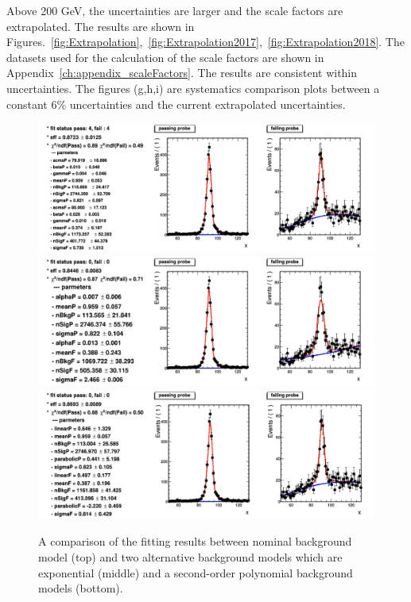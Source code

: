 Above 200 GeV, the uncertainties are larger and the scale factors are extrapolated. The results are shown in Figures.~\ref{fig:Extrapolation},~\ref{fig:Extrapolation2017},~\ref{fig:Extrapolation2018}. The datasets used for the calculation of the scale factors are shown in Appendix~\ref{ch:appendix_scaleFactors}. The results are consistent within uncertainties. The figures (g,h,i) are systematics comparison plots between a constant 6\% uncertainties and the current extrapolated uncertainties.

\begin{figure}[!htbp]

  \centering
   \caption{A comparison of the fitting results between nominal background model (top) and two alternative background models which are exponential (middle) and a second-order polynomial background models (bottom).}
  \includegraphics[width=1.0\textwidth]{fig/NominalBkg.png}\\
  \includegraphics[width=1.0\textwidth]{fig/AltBkg_exponential.png}\\
 \includegraphics[width=1.0\textwidth]{fig/AltBkg_Polynomial.png}
 
  \label{fig:Sysbkg}
\end{figure}

